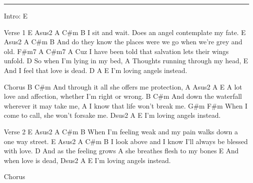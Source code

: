 \noindent\rule{\columnwidth}{1pt}

\begin{lstsong}
Intro: E

Verse 1
          E                         Asus2    A     C#m B
I sit and wait. Does an angel contemplate my fate.
            E                                     Asus2    A    C#m B
And do they know the places were we go when we're grey and old.
                F#m7         A                       C#m7    A
Cuz I have been told that salvation lets their wings unfold.
            D
So when I'm lying in my bed,
         A
Thoughts running through my head,
      E
And I feel that love is dead.
D          A         E
I'm loving angels instead.
 
Chorus
               B                       C#m
And through it all she offers me protection, 
                    A     Asus2       A        E
A lot love and affection, whether I'm right or wrong.
                  B                    C#m
And down the waterfall wherever it may take me,
                       A
I know that life won't break me.
               G#m                F#m
When I come to call, she won't forsake me.
Dsus2       A        E
I'm loving angels instead.
 
Verse 2
E                                              Asus2   A      C#m B
When I'm feeling weak and my pain walks down a one way street.
             E                         Asus2        A     C#m B
I look above and I know I'll always be blessed with love.
    D
And as the feeling grows 
             A
she breathes flesh to my bones
    E
And when love is dead, 
Dsus2       A          E
I'm loving angels instead.

Chorus
\end{lstsong}
\newpage


